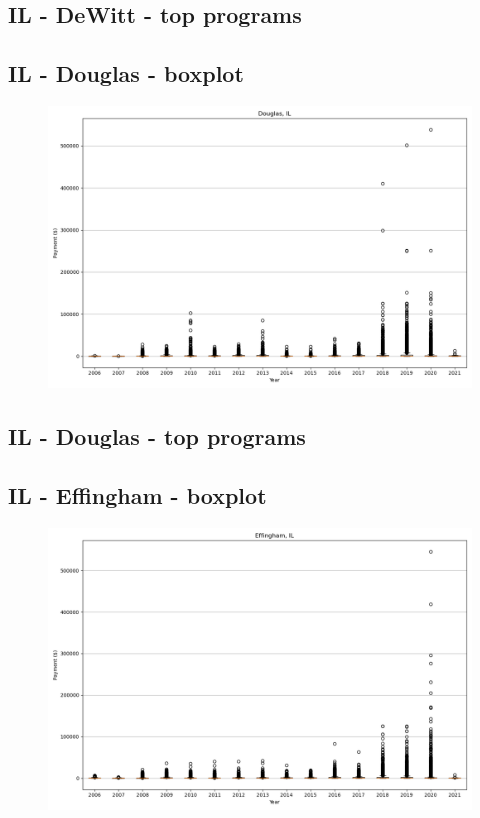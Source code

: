 \subsection*{IL - DeWitt - top programs}

\newpage
\subsection*{IL - Douglas - boxplot}
\begin{figure}[h]
\centering
\includegraphics[width=7in]{../output/boxplots/counties/Douglas-IL_boxplot.png}
\end{figure}


\subsection*{IL - Douglas - top programs}

\newpage
\subsection*{IL - Effingham - boxplot}
\begin{figure}[h]
\centering
\includegraphics[width=7in]{../output/boxplots/counties/Effingham-IL_boxplot.png}
\end{figure}


